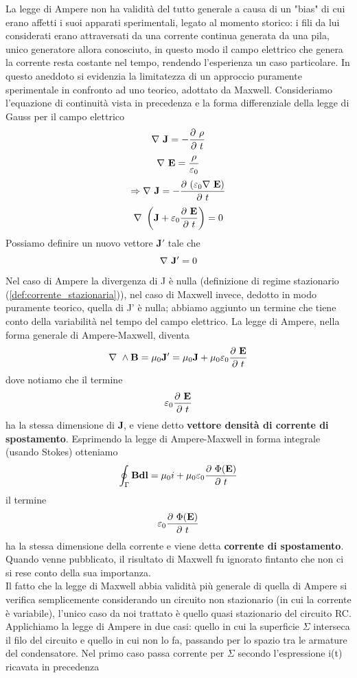 \documentclass[
10pt, %
a4paper, %
oneside, %
headinclude,footinclude, %
BCOR5mm, %
]{scrartcl}
\begin{document}
La legge di Ampere non ha validità del tutto generale a causa di un "bias" di cui erano affetti i suoi apparati sperimentali, legato al momento storico: i fili da lui considerati erano attraversati da una corrente continua generata da una pila, unico generatore allora conosciuto, in questo modo il campo elettrico che genera la corrente resta costante nel tempo, rendendo l'esperienza un caso particolare. In questo aneddoto si evidenzia la limitatezza di un approccio puramente sperimentale in confronto ad uno teorico, adottato da Maxwell. Consideriamo l'equazione di continuità vista in precedenza e la forma differenziale della legge di Gauss per il campo elettrico
\[\mathbf{\nabla\ }\mathbf{J}=-\frac{\partial\  \rho}{\partial\  t}\]
\[\mathbf{\nabla\ }\mathbf{E}=\frac{ \rho}{\varepsilon_0}\]
\[\Rightarrow \mathbf{\nabla\ }\mathbf{J}= -\frac{\partial\  (\varepsilon_0\mathbf{\nabla\ }\mathbf{E})}{\partial\  t}\]
\[\mathbf{\nabla\ }\left(\mathbf{J}+\varepsilon_0\frac{\partial\ \mathbf{E}}{\partial\  t}\right) = 0\]
Possiamo definire un nuovo vettore $\mathbf{J'}$ tale che
\[\mathbf{\nabla\ }\mathbf{J'}=0\]
Nel caso di Ampere la divergenza di J è nulla (definizione di regime stazionario (\ref{def:corrente_stazionaria})), nel caso di Maxwell invece, dedotto in modo puramente teorico, quella di J' è nulla; abbiamo aggiunto un termine che tiene conto della variabilità nel tempo del campo elettrico. La legge di Ampere, nella forma generale di Ampere-Maxwell, diventa
\[\mathbf{\nabla\ }\wedge\mathbf{B}=\mu_0\mathbf{J'}=\mu_0\mathbf{J}+\mu_0\varepsilon_0\frac{\partial\ \mathbf{E}}{\partial\  t}\]
dove notiamo che il termine
\[\varepsilon_0\frac{\partial\ \mathbf{E}}{\partial\  t}\]
ha la stessa dimensione di \(\mathbf{J}\), e viene detto \textbf{vettore densità di corrente di spostamento}. Esprimendo la legge di Ampere-Maxwell in forma integrale (usando Stokes) otteniamo
\[\oint_{\Gamma}\mathbf{B}\mathbf{dl}= \mu_0i + \mu_0\varepsilon_0\frac{\partial\ \Phi(\mathbf{E})}{\partial\  t}\]
il termine
\[\varepsilon_0\frac{\partial\ \Phi(\mathbf{E})}{\partial\  t}\]
ha la stessa dimensione della corrente e viene detta \textbf{corrente di spostamento}.\\
Quando venne pubblicato, il risultato di Maxwell fu ignorato fintanto che non ci si rese conto della sua importanza.\\
Il fatto che la legge di Maxwell abbia validità più generale di quella di Ampere si verifica semplicemente considerando un circuito non stazionario (in cui la corrente è variabile), l'unico caso da noi trattato è quello quasi stazionario del circuito RC. Applichiamo la legge di Ampere in due casi: quello in cui la superficie $\Sigma$ interseca il filo del circuito e quello in cui non lo fa, passando per lo spazio tra le armature del condensatore. Nel primo caso passa corrente per $\Sigma$ secondo l'espressione i(t) ricavata in precedenza
\end{document}

